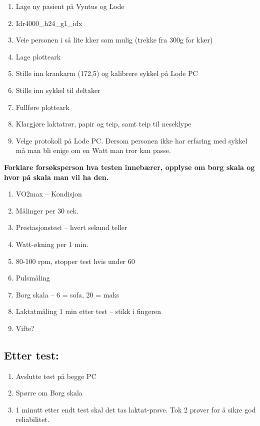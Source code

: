 \documentclass[
  letterpaper,
  DIV=11,
  numbers=noendperiod]{scrreprt}
\providecommand{\tightlist}{%
  \setlength{\itemsep}{0pt}\setlength{\parskip}{0pt}}\usepackage{longtable,booktabs,array}
\begin{document}
\begin{enumerate}
\def\labelenumi{\arabic{enumi}.}
\item
  Lage ny pasient på Vyntus og Lode
\item
  Idr4000\_h24\_g1\_idx
\item
  Veie personen i så lite klær som mulig (trekke fra 300g for klær)
\item
  Lage plotteark
\item
  Stille inn krankarm (172,5) og kalibrere sykkel på Lode PC
\item
  Stille inn sykkel til deltaker
\item
  Fullføre plotteark
\item
  Klargjøre laktatrør, papir og teip, samt teip til neseklype
\item
  Velge protokoll på Lode PC. Dersom personen ikke har erfaring med
  sykkel må man bli enige om en Watt man tror kan passe.
\end{enumerate}

\textbf{Forklare forsøksperson hva testen innebærer, opplyse om borg
skala og hvor på skala man vil ha den.}

\begin{enumerate}
\def\labelenumi{\arabic{enumi}.}
\tightlist
\item
  VO2max -- Kondisjon
\item
  Målinger per 30 sek.
\item
  Prestasjonstest -- hvert sekund teller
\item
  Watt-økning per 1 min.
\item
  80-100 rpm, stopper test hvis under 60
\item
  Pulsmåling
\item
  Borg skala -- 6 = sofa, 20 = maks
\item
  Laktatmåling 1 min etter test -- stikk i fingeren
\item
  Vifte?
\end{enumerate}

\subsection{Etter test:}\label{etter-test}

\begin{enumerate}
\def\labelenumi{\arabic{enumi}.}
\tightlist
\item
  Avslutte test på begge PC
\item
  Spørre om Borg skala
\item
  1 minutt etter endt test skal det tas laktat-prøve. Tok 2 prøver for å
  sikre god reliabilitet.
\end{enumerate}
\end{document}
